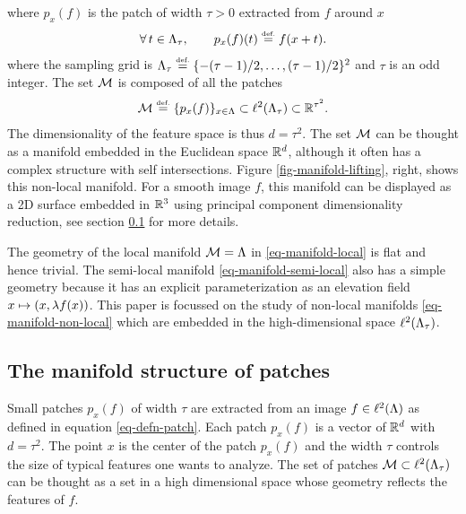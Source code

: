 \documentclass[final]{siamltex}
\begin{document}
\begin{rs}
	where $p_x(f)$ is the patch of width $\tau>0$ extracted from $f$ around $x$
	\begin{equation}
		\label{eq-defn-patch}
		\foralls t \in \La_\tau, \qquad p_x(f)(t) \eqdef f(x+t). 
	\end{equation}
	where the sampling grid is $\Lambda_\tau \stackrel{\mbox{\upshape\tiny def.}}{=} \{-(\tau-1)/2,\ldots,(\tau-1)/2\}^2$ and $\tau$ is an odd integer.
	The set $\mathcal{M}$ is composed of all the patches
	\begin{equation}
		\label{eq-manifold-non-local}
		\Mm \eqdef \{p_x(f)\}_{x \in \La} \subset \ldeux(\La_\tau) \subset \RR^{\tau^2}.
	\end{equation}
	The dimensionality of the feature space is thus $d = \tau^2$.
	The set $\mathcal{M}$ can be thought as a manifold embedded in the Euclidean space $\mathbb{R}^d$, although it often has a complex structure with self intersections. Figure \ref{fig-manifold-lifting}, right, shows this non-local manifold. For a smooth image $f$, this manifold can be displayed as a 2D surface embedded in $\mathbb{R}^3$ using principal component dimensionality reduction, see section \ref{subsect-manifold-structure} for more details.
\end{rs}
The geometry of the local manifold $\mathcal{M}=\Lambda$ in \eqref{eq-manifold-local} is flat and hence trivial. The semi-local manifold \eqref{eq-manifold-semi-local} also has a simple geometry because it has an explicit parameterization as an elevation field $x \mapsto (x,\lambda f(x))$. This paper is focussed on the study of non-local manifolds \eqref{eq-manifold-non-local} which are embedded in the high-dimensional space $\ell^2(\Lambda_\tau)$. 

\subsection{The manifold structure of patches}
\label{subsect-manifold-structure}
\newcommand{\tMm}{\tilde \Mm}

Small patches $p_x(f)$ of width $\tau$ are extracted from an image $f \in \ell^2(\Lambda)$ as defined in equation \eqref{eq-defn-patch}. Each patch $p_x(f)$ is a vector of $\mathbb{R}^d$ with $d=\tau^2$. The point $x$ is the center of the patch $p_x(f)$ and the width $\tau$ controls the size of typical features one wants to analyze. The set of patches $\mathcal{M} \subset \ell^2(\Lambda_\tau)$ can be thought as a set in a high dimensional space whose geometry reflects the features of $f$. 
\end{document}
